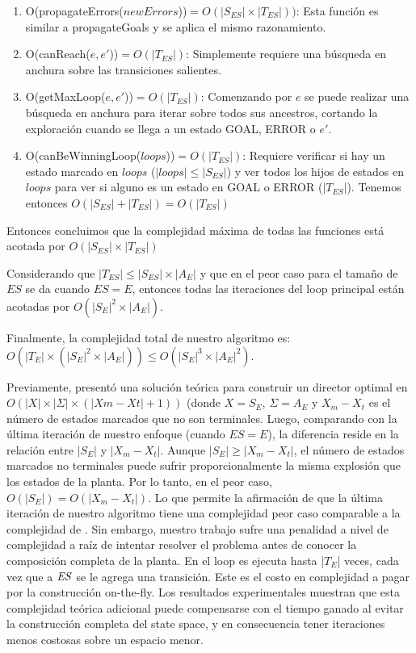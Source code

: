 \begin{enumerate}
	\item O(propagateErrors($newErrors$))$ = O(|S_{ES}| \times |T_{ES}|))$: Esta función es similar a propagateGoals y se aplica el mismo razonamiento.	
	
	\item O(canReach($e, e'$))$ = O(|T_{ES}|)$: Simplemente requiere una búsqueda en anchura sobre las transiciones salientes.
	
	\item O(getMaxLoop($e, e'$))$ = O(|T_{ES}|)$: 
	Comenzando por $e$ se puede realizar una búsqueda en anchura para iterar sobre todos sus ancestros, cortando la exploración cuando se llega a un estado GOAL, ERROR o $e'$. 
	
	
	\item O(canBeWinningLoop($loops$))$ = O(|T_{ES}|)$: Requiere verificar si hay un estado marcado en $loops$ ($|loops| \leq |S_{ES}|$) y ver todos los hijos de estados en $loops$ para ver si alguno es un estado en GOAL o ERROR ($|T_{ES}|$).  
	Tenemos entonces $O(|S_{ES}| + |T_{ES}|) = O(|T_{ES}|)$
	
\end{enumerate}

Entonces concluimos que la complejidad máxima de todas las funciones está acotada por $O(|S_{ES}| \times |T_{ES}|)$  

Considerando que $|T_{ES}| \leq|S_{ES}|\times|A_E|$ y que en el peor caso para el tamaño de $ES$ se da cuando $ES=E$, entonces todas las iteraciones del loop principal están acotadas por $O(|S_E|^2\times|A_E|)$.

Finalmente, la complejidad total de nuestro algoritmo es: $O(|T_E| \times (|S_E|^2 \times |A_E|)) \leq O(|S_E|^3 \times |A_E|^2)$.

Previamente, \cite{Huang:2007:Optimal}
presentó una solución teórica para construir un director optimal en $O(|X| \times |\Sigma| × (|X m − X t | + 1))$ (donde $X=S_E$, $\Sigma = A_E$ y $X_m - X_t$ es el número de 
estados marcados que no son terminales. 
Luego, comparando \cite{Huang:2007:Optimal} 
con la última iteración de nuestro enfoque (cuando $ES=E$), la diferencia reside en la relación entre
$|S_E|$ y $|X_m - X_t|$. 
Aunque $|S_E| \geq |X_m - X_t|$, el número de estados marcados no terminales puede sufrir proporcionalmente la misma explosión que los estados de la planta.
Por lo tanto, en el peor caso, $O(|S_E|) = O(|X_m - X_t|)$. Lo que permite la afirmación de que la última iteración de nuestro algoritmo tiene una complejidad peor caso comparable a la complejidad de 
\cite{Huang:2007:Optimal}.
Sin embargo, nuestro trabajo sufre una penalidad a nivel de complejidad a raíz de intentar resolver el problema antes de conocer la composición completa de la planta. En \DCS el loop es ejecuta hasta
|$T_E$| veces, cada vez que a $\mathit{ES}$ se le agrega una transición. Este es el costo en complejidad a pagar por la construcción on-the-fly. 
Los resultados experimentales muestran que esta complejidad teórica adicional puede compensarse con el tiempo ganado al evitar la construcción completa del state space, y en consecuencia tener iteraciones menos costosas sobre un espacio menor. 







